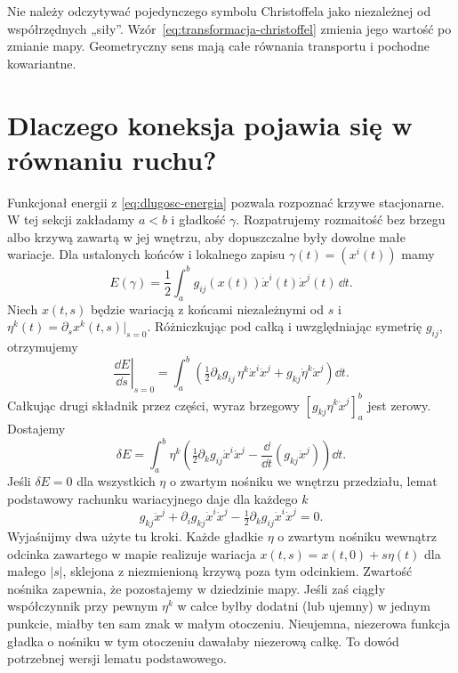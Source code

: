 Nie należy odczytywać pojedynczego symbolu
Christoffela jako niezależnej od współrzędnych
„siły”. Wzór~\eqref{eq:transformacja-christoffel}
zmienia jego wartość po zmianie mapy.
Geometryczny sens mają całe równania
transportu i pochodne kowariantne.

\section{Dlaczego koneksja pojawia się w równaniu ruchu?}
\label{sec:energia-koneksja}

Funkcjonał energii z \eqref{eq:dlugosc-energia}
pozwala rozpoznać krzywe stacjonarne.
W tej sekcji zakładamy $a<b$ i gładkość $\gamma$.
Rozpatrujemy rozmaitość bez brzegu albo krzywą zawartą
w jej wnętrzu, aby dopuszczalne były dowolne małe wariacje.
Dla ustalonych końców i lokalnego zapisu
$\gamma(t)=(x^i(t))$ mamy
\begin{equation}\label{eq:energia-lokalna-koneksja}
 E(\gamma)=\frac12\int_a^b
       g_{ij}(x(t))\dot x^i(t)\dot x^j(t)\,\dd t.
\end{equation}
Niech $x(t,s)$ będzie wariacją z końcami
niezależnymi od $s$ i
$\eta^k(t)=\partial_sx^k(t,s)|_{s=0}$.
Różniczkując pod całką i uwzględniając
symetrię $g_{ij}$, otrzymujemy
\[
 \left.\frac{\dd E}{\dd s}\right|_{s=0}
 =\int_a^b\left(
  \tfrac12\partial_k g_{ij}\,\eta^k\dot x^i\dot x^j
  +g_{kj}\dot\eta^k\dot x^j\right)\dd t.
\]
Całkując drugi składnik przez części,
wyraz brzegowy $[g_{kj}\eta^k\dot x^j]_a^b$
jest zerowy. Dostajemy
\[
 \delta E=\int_a^b\eta^k
 \left(\tfrac12\partial_k g_{ij}\dot x^i\dot x^j
      -\frac{\dd}{\dd t}(g_{kj}\dot x^j)\right)\dd t.
\]
Jeśli $\delta E=0$ dla wszystkich $\eta$
o zwartym nośniku we wnętrzu przedziału,
lemat podstawowy rachunku wariacyjnego
daje dla każdego $k$
\[
 g_{kj}\ddot x^j
 +\partial_i g_{kj}\dot x^i\dot x^j
 -\tfrac12\partial_k g_{ij}\dot x^i\dot x^j=0.
\]
Wyjaśnijmy dwa użyte tu kroki. Każde gładkie $\eta$ o
zwartym nośniku wewnątrz odcinka zawartego w mapie
realizuje wariacja $x(t,s)=x(t,0)+s\eta(t)$ dla małego
$|s|$, sklejona z niezmienioną krzywą poza tym odcinkiem.
Zwartość nośnika zapewnia, że pozostajemy w dziedzinie mapy.
Jeśli zaś ciągły współczynnik przy pewnym $\eta^k$ w całce
byłby dodatni (lub ujemny) w jednym punkcie, miałby ten sam
znak w małym otoczeniu. Nieujemna, niezerowa funkcja gładka
o nośniku w tym otoczeniu dawałaby niezerową całkę.
To dowód potrzebnej wersji lematu podstawowego.

